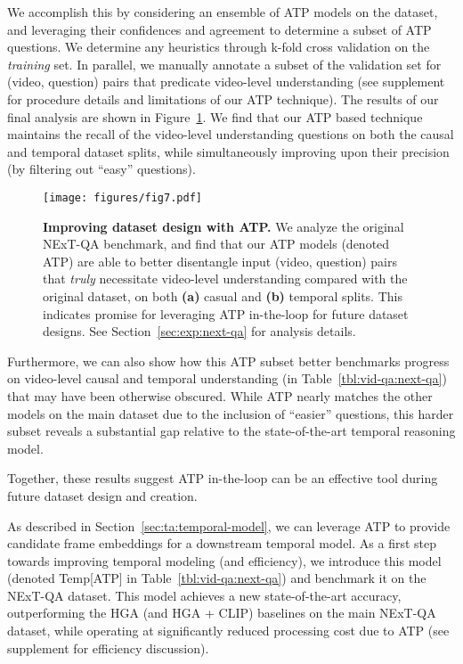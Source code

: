 We accomplish this by considering an ensemble of ATP models on the dataset, and leveraging their confidences and agreement to determine a subset of ATP questions. We determine any heuristics through k-fold cross validation on the \textit{training} set. In parallel, we manually annotate a subset of the validation set for (video, question) pairs that predicate video-level understanding (see supplement for procedure details and limitations of our ATP technique). The results of our final analysis are shown in Figure~\ref{fig:exp-nextqa-disentanglement}. We find that our ATP based technique maintains the recall of the video-level understanding questions on both the causal and temporal dataset splits, while simultaneously improving upon their precision (by filtering out ``easy'' questions). 



\begin{figure}[t]
\begin{center}
\centerline{\texttt{[image: figures/fig7.pdf]}}
\vskip -0.1in
\caption{\textbf{Improving dataset design with ATP.} We analyze the original NExT-QA \cite{xiao2021next} benchmark, and find that our ATP models (denoted ATP) are able to better disentangle input (video, question) pairs that \textit{truly} necessitate video-level understanding compared with the original dataset, on both \textbf{(a)} casual and \textbf{(b)} temporal splits. This indicates promise for leveraging ATP in-the-loop for future dataset designs. See Section~\ref{sec:exp:next-qa} for analysis details.
}
\label{fig:exp-nextqa-disentanglement}
\end{center}
\vskip -0.3in
\end{figure}

Furthermore, we can also show how this ATP subset better benchmarks progress on video-level causal and temporal understanding (in Table~\ref{tbl:vid-qa:next-qa}) that may have been otherwise obscured. While ATP nearly matches the other models on the main dataset due to the inclusion  of ``easier'' questions, this harder subset reveals a substantial gap relative to the state-of-the-art temporal reasoning model. 

Together, these results suggest ATP in-the-loop can be an effective tool during future dataset design and creation.

 As described in Section~\ref{sec:ta:temporal-model}, we can leverage ATP to provide candidate frame embeddings for a downstream temporal model. As a first step towards improving temporal modeling (and efficiency), we introduce this model (denoted Temp[ATP] in Table~\ref{tbl:vid-qa:next-qa}) and benchmark it on the NExT-QA dataset. This model achieves a new state-of-the-art accuracy, outperforming the HGA (and HGA + CLIP) baselines on the main NExT-QA dataset, while operating at significantly reduced processing cost due to ATP (see supplement for efficiency discussion).

